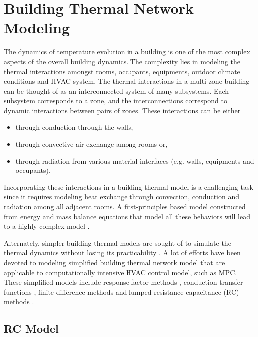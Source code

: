 \section{Building Thermal Network Modeling} \label{cha:bg:rc}

The dynamics of temperature evolution in a building is one of the most complex aspects of the overall building dynamics. The complexity lies in modeling the thermal interactions amongst rooms, occupants, equipments, outdoor climate conditions and HVAC system. The thermal interactions in a multi-zone building can be thought of as an interconnected system of many subsystems. Each subsystem corresponds to a zone, and the interconnections correspond to dynamic interactions between pairs of zones. These interactions can be either 
\begin{itemize}
	\item through conduction through the walls, 
	\item through convective air exchange among rooms or,
	\item through radiation from various material interfaces (e.g. walls, equipments and occupants). 
\end{itemize}
\noindent Incorporating these interactions in a building thermal model is a challenging task since it requires modeling heat exchange through convection, conduction and radiation among all adjacent rooms. A first-principles based model constructed from energy and mass balance equations that model all these behaviors will lead to a highly complex model \citep{goyal2012method}. 

Alternately, simpler building thermal models are sought of to simulate the thermal dynamics without losing its practicability \citep{kramer2012simplified,cigler2013beyond}. A lot of efforts have been devoted to modeling simplified building thermal network model that are applicable to computationally intensive HVAC control model, such as MPC. 
These simplified models include response factor methods \citep{mitalas1967room}, conduction transfer functions \citep{stephenson1971calculation}, finite difference methods \citep{clarke1985energy} and lumped resistance-capacitance (RC) methods \citep{crabb1987simplified}.

\subsection{RC Model}

